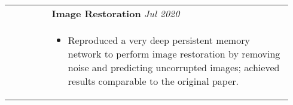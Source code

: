 \documentclass[letterpaper, 10pt, oneside]{article}
\newcommand{\bdit}[1]{{\textbf{#1}}}
\begin{document}
\begin{longtable}{@{} p{0.14\linewidth} p{0.8\linewidth}}
    \\[-1.4ex]
                         & \bdit{Image Restoration} \hfill \textsl{Jul 2020}                                                                                                                                                                 \\
                         & \parbox{0.8\textwidth}{                                                                                                                                                                                           %
        \begin{itemize}[leftmargin=*, itemsep=-0.88ex, topsep=0.2ex]
            \item Reproduced a very deep persistent memory network to perform image restoration by removing noise and predicting uncorrupted images; achieved results comparable to the original paper.
        \end{itemize}
    }                                                                                                                                                                                                                                        \\
    \\[-1.4ex]



\end{longtable}
\end{document}
